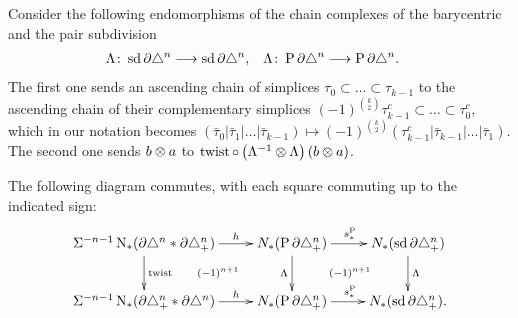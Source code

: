 Consider the following endomorphisms of the chain complexes of the barycentric and the pair subdivision
\begin{align*}
	\Lambda \colon  \operatorname{sd} \partial\triangle^n&\longrightarrow \operatorname{sd} \partial\triangle^n,
	&
	\Lambda \colon  \operatorname{P} \partial\triangle^n&\longrightarrow \operatorname{P} \partial\triangle^n.
\end{align*}
The first one sends an ascending chain of simplices $\tau_0\subset \ldots\subset \tau_{k-1}$ to the ascending chain of their complementary simplices $(-1)^{\binom{k}{2}} \tau_{k-1}^c\subset \ldots\subset\tau_0^c$, which in our notation becomes $(\bar{\tau}_0|\bar{\tau}_1|\ldots|\bar{\tau}_{k-1})\mapsto (-1)^{\binom{k}{2}}(\tau_{k-1}^c|\bar{\tau}_{k-1}|\ldots|\bar{\tau}_1)$. The second one sends $b \otimes  a$ to $\operatorname{twist}\circ \left(\Lambda^{-1} \otimes  \Lambda\right)(b \otimes  a)$.
\begin{lemma} The following diagram commutes, with each square commuting up to the indicated sign:
	\begin{equation}\label{diag:newdiag}
		\xymatrix{
			\susp{-n-1}\chains(\partial \simplex^n*\partial\asimplex^n)\ar[r]^-h\ar[d]^{\twist} \ar@{}[dr] | {(-1)^{n+1}}&\cadenas(\Psd \partial \asimplex^n) \ar[r]^{s_*^{\Psd}}\ar[d]_{\alex}  \ar@{}[dr] | {(-1)^{n+1}}& \cadenas(\sd \partial \asimplex^n)\ar[d]^{\alex}\\
			\susp{-n-1}\chains(\partial \asimplex^n*\partial\simplex^n)\ar[r]^-h &\cadenas(\Psd \partial \asimplex^n) \ar[r]^{s_*^{\Psd}}& \cadenas(\sd \partial \asimplex^n).
		}
	\end{equation}
\end{lemma}

